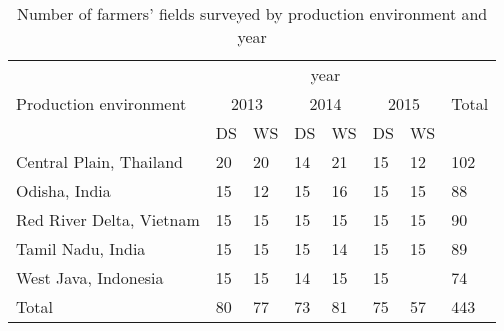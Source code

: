 \begin{table}[!h]
\centering
    \begin{tabular}{llllllll}
    \hline
    \multirow{3}{*}{Production environment} & \multicolumn{6}{c}{year} & \multirow{3}{*}{Total} \\ \cline{2-7}
                         & \multicolumn{2}{c}{2013} & \multicolumn{2}{c}{2014} & \multicolumn{2}{c}{2015} &     \\ \cline{2-7}
                         & DS         & WS         & DS          & WS         & DS          & WS         &     \\
                        \hline
        Central Plain, Thailand           &20          & 20          & 14          &21          &15           &12            & 102  \\
        Odisha, India                     &15            & 12          & 15          & 16         & 15          & 15           & 88  \\
        Red River Delta, Vietnam                   &15            & 15          & 15          & 15           & 15            & 15           & 90   \\
        Tamil Nadu, India                 &15            & 15          &  15           & 14         & 15            & 15         & 89  \\
        West Java, Indonesia              & 15           & 15          &   14          & 15         & 15          &            & 74   \\
                        \hline
        Total           & 80          & 77         & 73         & 81         & 75          & 57         & 443   \\
        \hline               
    \end{tabular}
    \caption{Number of farmers' fields surveyed by production environment and year}
    \label{table:Survey_data}
\end{table}